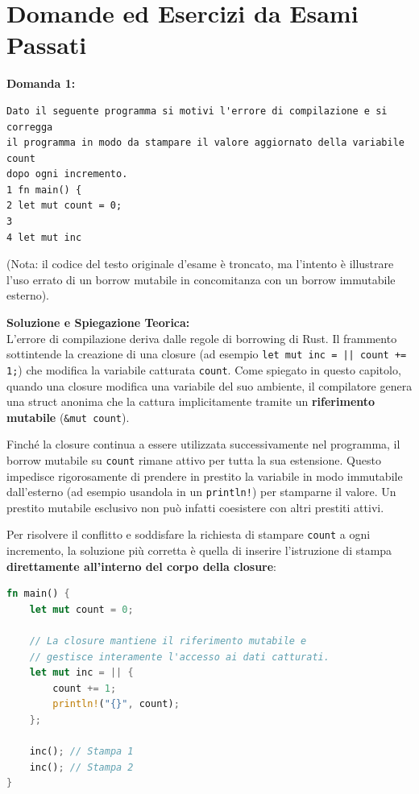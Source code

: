 \section{Domande ed Esercizi da Esami Passati}

\begin{exambox}
\textbf{Domanda 1:}
\begin{verbatim}
Dato il seguente programma si motivi l'errore di compilazione e si corregga 
il programma in modo da stampare il valore aggiornato della variabile count 
dopo ogni incremento.
1 fn main() {
2 let mut count = 0;
3 
4 let mut inc
\end{verbatim}
(Nota: il codice del testo originale d'esame è troncato, ma l'intento è illustrare l'uso errato di un borrow mutabile in concomitanza con un borrow immutabile esterno).

\textbf{Soluzione e Spiegazione Teorica:} \\
L'errore di compilazione deriva dalle regole di borrowing di Rust. Il frammento sottintende la creazione di una closure (ad esempio \texttt{let mut inc = || count += 1;}) che modifica la variabile catturata \texttt{count}. Come spiegato in questo capitolo, quando una closure modifica una variabile del suo ambiente, il compilatore genera una struct anonima che la cattura implicitamente tramite un \textbf{riferimento mutabile} (\texttt{\&mut count}). 

Finché la closure continua a essere utilizzata successivamente nel programma, il borrow mutabile su \texttt{count} rimane attivo per tutta la sua estensione. Questo impedisce rigorosamente di prendere in prestito la variabile in modo immutabile dall'esterno (ad esempio usandola in un \texttt{println!}) per stamparne il valore. Un prestito mutabile esclusivo non può infatti coesistere con altri prestiti attivi.

Per risolvere il conflitto e soddisfare la richiesta di stampare \texttt{count} a ogni incremento, la soluzione più corretta è quella di inserire l'istruzione di stampa \textbf{direttamente all'interno del corpo della closure}:
\begin{lstlisting}[language=Rust]
fn main() {
    let mut count = 0;
    
    // La closure mantiene il riferimento mutabile e 
    // gestisce interamente l'accesso ai dati catturati.
    let mut inc = || {
        count += 1;
        println!("{}", count);
    };
    
    inc(); // Stampa 1
    inc(); // Stampa 2
}
\end{lstlisting}
\end{exambox}

